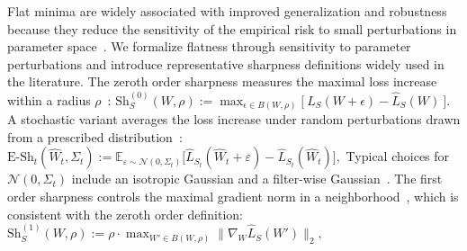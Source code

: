 \documentclass[10pt]{article} %
\begin{document}
Flat minima are widely associated with improved generalization and robustness because they reduce the sensitivity of the empirical risk to small perturbations in parameter space~\citep{FlatMinima1997,wu2017understandinggeneralizationdeeplearning,NEURIPS2020_518a38cc,bahri2022sharpnessawareminimizationimproveslanguage,NEURIPS2021_995f5e03,JMLRAnEmpiricalInvestigatio,yangRevisitingFlatnessAwareOptimization2025}.
We formalize flatness through sensitivity to parameter perturbations and introduce representative  sharpness definitions widely used in the literature.
The zeroth order sharpness measures the maximal loss increase within a radius $\rho$~\citep{AWP2020,foretSharpnessAwareMinimizationEfficiently2021}: 
$\mathrm{Sh}^{(0)}_S(W,\rho) :=\max_{{\epsilon}\in B(W,\rho)} \Big[\ \hat{L}_{S}(W+{\epsilon})-\hat{L}_{S}(W)\ \Big].$
A %
stochastic variant averages the loss increase under random perturbations drawn from a prescribed distribution~\citep{liRevisitingRandomWeight2024,jiang2019fantasticgeneralizationmeasures}:
$\mathrm{E\text{-}Sh}_t(\hat{W}_t, \Sigma_t)
 :=
 \mathbb{E}_{\varepsilon \sim \mathcal{N}(0,\Sigma_t)}
 \big[
 \hat{L}_{S_t}(\hat{W}_t+\varepsilon) - \hat{L}_{S_t}(\hat{W}_t)
 \big],$
Typical choices for $\mathcal{N}(0,\Sigma_t)$ include an isotropic Gaussian and a filter-wise Gaussian~\citep{pmlr-v151-bisla22a}. The first order sharpness controls the maximal gradient norm in a neighborhood~\citep{Zhang_GAM}, which is consistent with the zeroth order definition:
$\mathrm{Sh}^{(1)}_S(W,\rho) := \rho\cdot \max_{W'\in B(W,\rho)} \big\|\nabla_{W} \hat{L}_S(W')\big\|_2,$
\end{document}
